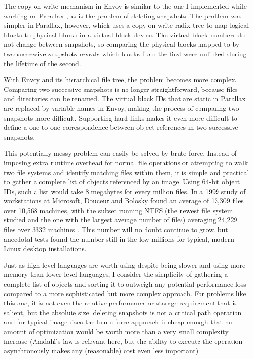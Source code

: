 The copy-on-write mechanism in Envoy is similar to the one I implemented while working on Parallax \cite{warfield}, as is the problem of deleting snapshots. The problem was simpler in Parallax, however, which uses a copy-on-write radix tree to map logical blocks to physical blocks in a virtual block device. The virtual block numbers do not change between snapshots, so comparing the physical blocks mapped to by two successive snapshots reveals which blocks from the first were unlinked during the lifetime of the second.

With Envoy and its hierarchical file tree, the problem becomes more complex. Comparing two successive snapshots is no longer straightforward, because files and directories can be renamed. The virtual block IDs that are static in Parallax are replaced by variable names in Envoy, making the process of comparing two snapshots more difficult. Supporting hard links makes it even more difficult to define a one-to-one correspondence between object references in two successive snapshots.

This potentially messy problem can easily be solved by brute force. Instead of imposing extra runtime overhead for normal file operations or attempting to walk two file systems and identify matching files within them, it is simple and practical to gather a complete list of objects referenced by an image. Using 64-bit object IDs, such a list would take 8 megabytes for every million files. In a 1999 study of workstations at Microsoft, Douceur and Bolosky found an average of 13,309 files over 10,568 machines, with the subset running NTFS (the newest file system studied and the one with the largest average number of files) averaging 24,229 files over 3332 machines \cite{douceur99}. This number will no doubt continue to grow, but anecdotal tests found the number still in the low millions for typical, modern Linux desktop installations.

Just as high-level languages are worth using despite being slower and using more memory than lower-level languages, I consider the simplicity of gathering a complete list of objects and sorting it to outweigh any potential performance loss compared to a more sophisticated but more complex approach. For problems like this one, it is not even the relative performance or storage requirement that is salient, but the absolute size: deleting snapshots is not a critical path operation and for typical image sizes the brute force approach is cheap enough that no amount of optimization would be worth more than a very small complexity increase (Amdahl's law \cite{amdahl} is relevant here, but the ability to execute the operation asynchronously makes any (reasonable) cost even less important).

